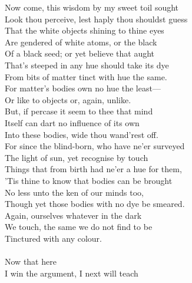 Now come, this wisdom by my sweet toil sought\\
Look thou perceive, lest haply thou shouldst guess\\
That the white objects shining to thine eyes\\
Are gendered of white atoms, or the black\\
Of a black seed; or yet believe that aught\\
That's steeped in any hue should take its dye\\
From bits of matter tinct with hue the same.\\
For matter's bodies own no hue the least—\\
Or like to objects or, again, unlike.\\
But, if percase it seem to thee that mind\\
Itself can dart no influence of its own\\
Into these bodies, wide thou wand'rest off.\\
For since the blind-born, who have ne'er surveyed\\
The light of sun, yet recognise by touch\\
Things that from birth had ne'er a hue for them,\\
'Tis thine to know that bodies can be brought\\
No less unto the ken of our minds too,\\
Though yet those bodies with no dye be smeared.\\
Again, ourselves whatever in the dark\\
We touch, the same we do not find to be\\
Tinctured with any colour.\\
\\
Now that here\\
I win the argument, I next will teach

